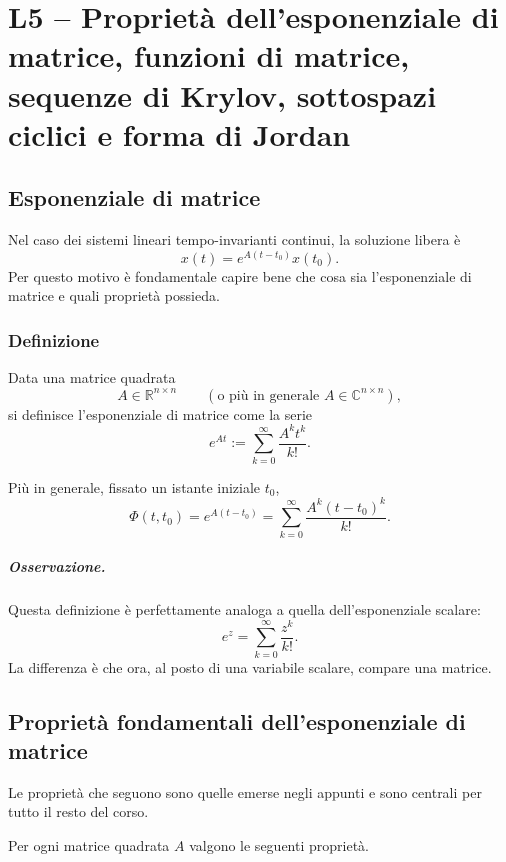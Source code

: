 \chapter{L5 -- Proprietà dell'esponenziale di matrice, funzioni di matrice, sequenze di Krylov, sottospazi ciclici e forma di Jordan}

\section{Esponenziale di matrice}

Nel caso dei sistemi lineari tempo-invarianti continui, la soluzione libera è
\[
x(t)=e^{A(t-t_0)}x(t_0).
\]
Per questo motivo è fondamentale capire bene che cosa sia l'esponenziale di matrice e quali proprietà possieda.

\subsection{Definizione}

Data una matrice quadrata
\[
A\in\mathbb{R}^{n\times n}
\qquad
(\text{o più in generale }A\in\mathbb{C}^{n\times n}),
\]
si definisce l'esponenziale di matrice come la serie
\begin{equation}
e^{At}
:=
\sum_{k=0}^{\infty}\frac{A^k t^k}{k!}.
\label{eq:L5_def_exp}
\end{equation}

Più in generale, fissato un istante iniziale $t_0$,
\begin{equation}
\Phi(t,t_0)=e^{A(t-t_0)}
=
\sum_{k=0}^{\infty}\frac{A^k (t-t_0)^k}{k!}.
\label{eq:L5_phi_exp}
\end{equation}

\paragraph{Osservazione.}
Questa definizione è perfettamente analoga a quella dell'esponenziale scalare:
\[
e^z=\sum_{k=0}^{\infty}\frac{z^k}{k!}.
\]
La differenza è che ora, al posto di una variabile scalare, compare una matrice.

\section{Proprietà fondamentali dell'esponenziale di matrice}

Le proprietà che seguono sono quelle emerse negli appunti e sono centrali per tutto il resto del corso.

\begin{proposizione}
Per ogni matrice quadrata $A$ valgono le seguenti proprietà.
\end{proposizione}

